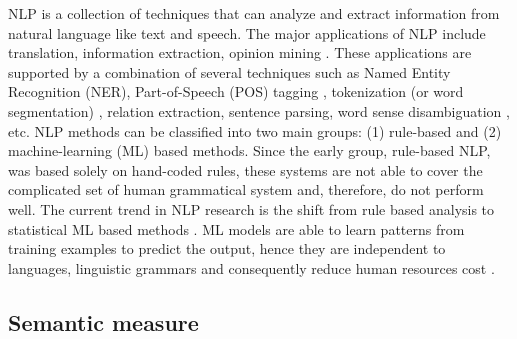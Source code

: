 \documentclass[Journal, InsideFigs, DoubleSpace]{ascelike} %
\begin{document}
NLP is a collection of techniques that can analyze and extract information from natural language like text and speech. The major applications of NLP include translation, information extraction, opinion mining \cite{Cambria14}. These applications are supported by a combination of several techniques such as Named Entity Recognition (NER), Part-of-Speech (POS) tagging \cite{Toutanova03,Cunningham02}, tokenization (or word segmentation) \cite{Webster92,Zhao11}, relation extraction, sentence parsing, word sense disambiguation \cite{Lesk86,Yarowsky95,Navigli09}, etc. NLP methods can be classified into two main groups: (1) rule-based and (2) machine-learning (ML) based methods. Since the early group, rule-based NLP, was based solely on hand-coded rules, these systems are not able to cover the complicated set of human grammatical system \cite{Marcus95} and, therefore, do not perform well. The current trend in NLP research is the shift from rule based analysis to statistical ML based methods \cite{Cambria14}. ML models are able to learn patterns from training examples to predict the output, hence they are independent to languages, linguistic grammars and consequently reduce human resources cost \cite{costa-jussa12}. 

\subsection{Semantic measure}

\end{document}
